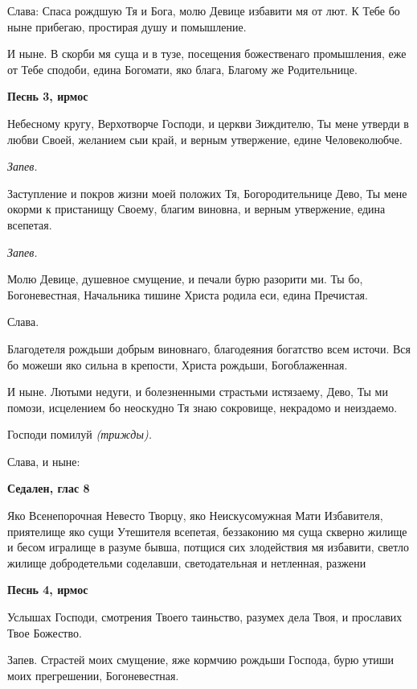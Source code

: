 Слава: Спаса рождшую Тя и Бога, молю Девице избавити мя от лют. К Тебе бо ныне прибегаю, простирая душу и помышление.


И ныне. В скорби мя суща и в тузе, посещения божественаго промышления, еже от Тебе сподоби, едина Богомати, яко блага, Благому же Родительнице.





\bfseries Песнь 3, ирмос\normalfont{}


Небесному кругу, Верхотворче Господи, и церкви Зиждителю, Ты мене утверди в любви Своей, желанием сыи край, и верным утвержение, едине Человеколюбче.


\itshape Запев.\normalfont{}


Заступление и покров жизни моей положих Тя, Богородительнице Дево, Ты мене окорми к пристанищу Своему, благим виновна, и верным утвержение, едина всепетая.


\itshape Запев.\normalfont{}


Молю Девице, душевное смущение, и печали бурю разорити ми. Ты бо, Богоневестная, Начальника тишине Христа родила еси, едина Пречистая.


Слава.


Благодетеля рождьши добрым виновнаго, благодеяния богатство всем источи. Вся бо можеши яко сильна в крепости, Христа рождьши, Богоблаженная.


И ныне. Лютыми недуги, и болезненными страстьми истязаему, Дево, Ты ми помози, исцелением бо неоскудно Тя знаю сокровище, некрадомо и неиздаемо.


Господи помилуй \itshape (трижды)\normalfont{}.


Слава, и ныне:





\bfseries Седален, глас 8\normalfont{}


Яко Всенепорочная Невесто Творцу, яко Неискусомужная Мати Избавителя, приятелище яко сущи Утешителя всепетая, беззаконию мя суща скверно жилище и бесом игралище в разуме бывша, потщися сих злодействия мя избавити, светло жилище добродетельми соделавши, светодательная и нетленная, разжени





\bfseries Песнь 4, ирмос\normalfont{}


Услышах Господи, смотрения Твоего таиньство, разумех дела Твоя, и прославих Твое Божество.


Запев. Страстей моих смущение, яже кормчию рождьши Господа, бурю утиши моих прегрешении, Богоневестная.


